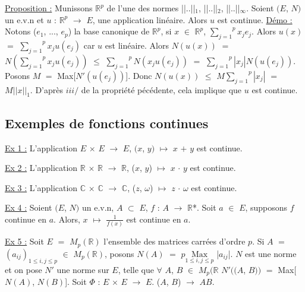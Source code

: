 \documentclass{article}
\begin{document}
\parindent=0cm
\smallbreak
\underline{Proposition :} \parindent=1cm \smallbreak
Munissons $\mathbb{R}^p$ de l'une des normes ||..||$_1$, ||..||$_2$, ||..||$_{\infty}$. Soient $(E$, $N)$ un e.v.n et $u$ : $\mathbb{R}^p$ $\longrightarrow$ $E$, une \smallbreak application linéaire. Alors $u$ est continue.
\parindent=0cm
\smallbreak
\underline{Démo :} \parindent=1cm \smallbreak
Notons ($e_1$, ..., $e_p$) la base canonique de $\mathbb{R}^p$, si $x$ $\in$ $\mathbb{R}^p$, $\overset{p}{\underset{j = 1}{\sum}}x_j e_j$. Alors $u(x)$ $=$ $\overset{p}{\underset{j = 1}{\sum}}x_j u(e_j)$ car $u$ est linéaire. \smallbreak Alors $N(u(x))$ $=$ $N( \overset{p}{\underset{j = 1}{\sum}}x_j u(e_j))$ $\leqslant$ 
$ \overset{p}{\underset{j = 1}{\sum}}N(x_j u(e_j))$ $=$ $ \overset{p}{\underset{j = 1}{\sum}}|x_j|N(u(e_j))$. Posons $M$ $=$ Max[$N'(u(e_j))$]. Donc \smallbreak $N(u(x))$ $\leqslant$ $M \overset{p}{\underset{j = 1}{\sum}}|x_j|$ $=$ $M||x||_1$. D'après $iii/$ de la propriété pécédente, cela implique que $u$ est continue.

\subsection{Exemples de fonctions continues}
\parindent=0cm
\smallbreak
\underline{Ex 1 :} \parindent=1cm \smallbreak
L'application $E$ $\times$ $E$ $\longrightarrow$ $E$, $(x$, $y)$ $\mapsto$ $x$ $+$ $y$ est continue.

\parindent=0cm
\smallbreak
\underline{Ex 2 :} \parindent=1cm \smallbreak
L'application $\mathbb{R}$ $\times$ $\mathbb{R}$ $\longrightarrow$ $\mathbb{R}$, ($x$, $y$) $\mapsto$ $x$ $\cdot$ $y$ est continue.

\parindent=0cm
\smallbreak
\underline{Ex 3 :} \parindent=1cm \smallbreak
L'application $\mathbb{C}$ $\times$ $\mathbb{C}$ $\longrightarrow$ $\mathbb{C}$, ($z$, $\omega$) $\mapsto$ $z$ $\cdot$ $\omega$ est continue.

\parindent=0cm
\smallbreak
\underline{Ex 4 :} \parindent=1cm \smallbreak
Soient $(E$, $N)$ un e.v.n, $A$ $\subset$ $E$, $f$ : $A$ $\longrightarrow$ $\mathbb{R}$*. Soit $a$ $\in$ $E$, supposons $f$ continue en $a$. Alors, $x$ $\mapsto$ $\frac{1}{f(x)}$ \smallbreak est continue en $a$.

\parindent=0cm
\smallbreak
\underline{Ex 5 :} \parindent=1cm \smallbreak
Soit $E$ $=$ $M_p(\mathbb{R})$ l'ensemble des matrices carrées d'ordre $p$. Si $A$ $=$ $(a_{ij})_{1 \leqslant i,j \leqslant p}$ $\in$ $M_p(\mathbb{R})$, posons \smallbreak $N(A)$ $=$ $p\underset{1 \leqslant i,j \leqslant p}{\text{Max}}$ |$a_{ij}$|. $N$ est une norme et on pose $N'$ une norme sur $E$, telle que $\forall$ $A$, $B$ $\in$ $M_p(\mathbb{R}$ \smallbreak $N'((A$, $B))$ $=$ Max[$N(A)$, $N(B)$]. Soit $\Phi$ : $E$ $\times$ $E$ $\longrightarrow$ $E$. ($A$, $B$) $\longrightarrow$ $AB$. 
\end{document}
